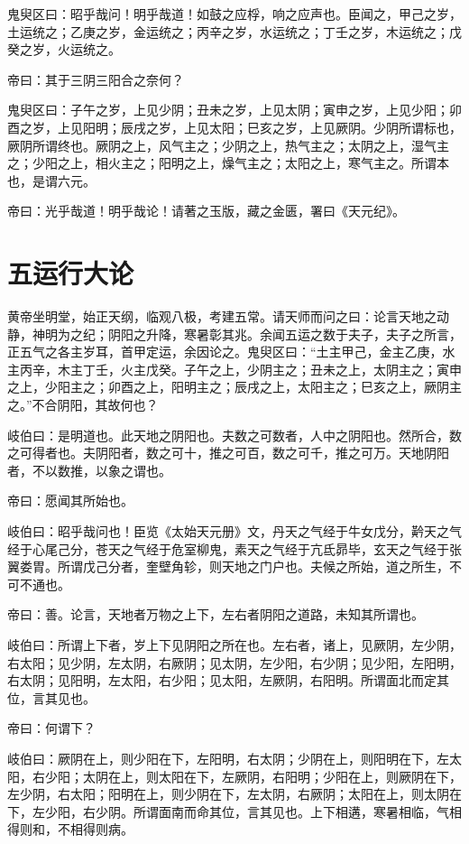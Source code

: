 \documentclass{article}%
\begin{document}
鬼臾区曰：昭乎哉问！明乎哉道！如鼓之应桴，响之应声也。臣闻之，甲己之岁，土运统之；乙庚之岁，金运统之；丙辛之岁，水运统之；丁壬之岁，木运统之；戊癸之岁，火运统之。

帝曰：其于三阴三阳合之奈何？

鬼臾区曰：子午之岁，上见少阴；丑未之岁，上见太阴；寅申之岁，上见少阳；卯酉之岁，上见阳明；辰戌之岁，上见太阳；巳亥之岁，上见厥阴。少阴所谓标也，厥阴所谓终也。厥阴之上，风气主之；少阴之上，热气主之；太阴之上，湿气主之；少阳之上，相火主之；阳明之上，燥气主之；太阳之上，寒气主之。所谓本也，是谓六元。

帝曰：光乎哉道！明乎哉论！请著之玉版，藏之金匮，署曰《天元纪》。
\section{五运行大论}
黄帝坐明堂，始正天纲，临观八极，考建五常。请天师而问之曰：论言天地之动静，神明为之纪；阴阳之升降，寒暑彰其兆。余闻五运之数于夫子，夫子之所言，正五气之各主岁耳，首甲定运，余因论之。鬼臾区曰：“土主甲己，金主乙庚，水主丙辛，木主丁壬，火主戊癸。子午之上，少阴主之；丑未之上，太阴主之；寅申之上，少阳主之；卯酉之上，阳明主之；辰戌之上，太阳主之；巳亥之上，厥阴主之。”不合阴阳，其故何也？

岐伯曰：是明道也。此天地之阴阳也。夫数之可数者，人中之阴阳也。然所合，数之可得者也。夫阴阳者，数之可十，推之可百，数之可千，推之可万。天地阴阳者，不以数推，以象之谓也。

帝曰：愿闻其所始也。

岐伯曰：昭乎哉问也！臣览《太始天元册》文，丹天之气经于牛女戊分，黅天之气经于心尾己分，苍天之气经于危室柳鬼，素天之气经于亢氐昴毕，玄天之气经于张翼娄胃。所谓戊己分者，奎壁角轸，则天地之门户也。夫候之所始，道之所生，不可不通也。

帝曰：善。论言，天地者万物之上下，左右者阴阳之道路，未知其所谓也。

岐伯曰：所谓上下者，岁上下见阴阳之所在也。左右者，诸上，见厥阴，左少阴，右太阳；见少阴，左太阴，右厥阴；见太阴，左少阳，右少阴；见少阳，左阳明，右太阴；见阳明，左太阳，右少阳；见太阳，左厥阴，右阳明。所谓面北而定其位，言其见也。

帝曰：何谓下？

岐伯曰：厥阴在上，则少阳在下，左阳明，右太阴；少阴在上，则阳明在下，左太阳，右少阳；太阴在上，则太阳在下，左厥阴，右阳明；少阳在上，则厥阴在下，左少阴，右太阳；阳明在上，则少阴在下，左太阴，右厥阴；太阳在上，则太阴在下，左少阳，右少阴。所谓面南而命其位，言其见也。上下相遘，寒暑相临，气相得则和，不相得则病。
\end{document}
